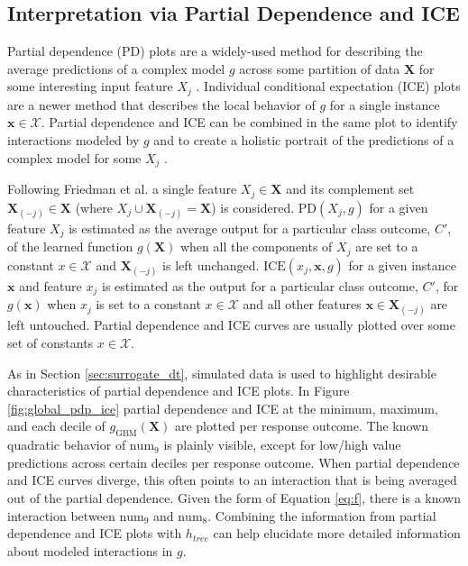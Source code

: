 \documentclass{article}
\begin{document}
\subsection{Interpretation via Partial Dependence and ICE}

Partial dependence (PD) plots are a widely-used method for describing the average predictions of a complex model $g$ across some partition of data $\mathbf{X}$ for some interesting input feature $X_j$ \cite{esl}. Individual conditional expectation (ICE) plots are a newer method that describes the local behavior of $g$ for a single instance $\mathbf{x} \in \mathcal{X}$. Partial dependence and ICE can be combined in the same plot to identify interactions modeled by $g$ and to create a holistic portrait of the predictions of a complex model for some $X_j$  \cite{ice_plots}.
	
Following Friedman et al. a single feature $X_j \in \mathbf{X}$ and its complement set $\mathbf{X}_{(-j)} \in \mathbf{X}$ (where $X_j \cup \mathbf{X}_{(-j)} = \mathbf{X}$) is considered. $\text{PD}(X_j, g)$ for a given feature $X_j$ is estimated as the average output for a particular class outcome, $C'$, of the learned function $g(\mathbf{X})$ when all the components of $X_j$ are set to a constant $x \in \mathcal{X}$ and $\mathbf{X}_{(-j)}$ is left unchanged. $\text{ICE}(x_j, \mathbf{x}, g)$ for a given instance $\mathbf{x}$ and feature $x_j$ is estimated as the output for a particular class outcome, $C'$, for $g(\mathbf{x})$ when $x_j$ is set to a constant $x \in \mathcal{X}$ and all other features $\mathbf{x} \in \mathbf{X}_{(-j)}$ are left untouched. Partial dependence and ICE curves are usually plotted over some set of constants $x \in \mathcal{X}$. 

As in Section \ref{sec:surrogate_dt}, simulated data is used to highlight desirable characteristics of partial dependence and ICE plots. In Figure \ref{fig:global_pdp_ice} partial dependence and ICE at the minimum, maximum, and each decile of $g_{\text{GBM}}(\mathbf{X})$ are plotted per response outcome. The known quadratic behavior of $\text{num}_9$ is plainly visible, except for low/high value predictions across certain deciles per response outcome. When partial dependence and ICE curves diverge, this often points to an interaction that is being averaged out of the partial dependence. Given the form of Equation \ref{eq:f}, there is a known interaction between $\text{num}_9$ and $\text{num}_8$. Combining the information from partial dependence and ICE plots with $h_{tree}$ can help elucidate more detailed information about modeled interactions in $g$.
\end{document}
